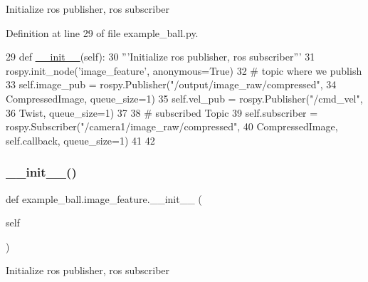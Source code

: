 \begin{DoxyVerb}Initialize ros publisher, ros subscriber\end{DoxyVerb}
 

Definition at line 29 of file example\+\_\+ball.\+py.


\begin{DoxyCode}
29     \textcolor{keyword}{def }\hyperlink{classstate__machine_1_1Play_a5993a23d8be7f7b2647f71ede0334957}{\_\_init\_\_}(self):
30         \textcolor{stringliteral}{'''Initialize ros publisher, ros subscriber'''}
31         rospy.init\_node(\textcolor{stringliteral}{'image\_feature'}, anonymous=\textcolor{keyword}{True})
32      \textcolor{comment}{# topic where we publish}
33         self.image\_pub = rospy.Publisher(\textcolor{stringliteral}{"/output/image\_raw/compressed"},
34                                          CompressedImage, queue\_size=1)
35         self.vel\_pub = rospy.Publisher(\textcolor{stringliteral}{"/cmd\_vel"},
36                                        Twist, queue\_size=1)
37 
38         \textcolor{comment}{# subscribed Topic}
39         self.subscriber = rospy.Subscriber(\textcolor{stringliteral}{"/camera1/image\_raw/compressed"},
40                                            CompressedImage, self.callback,  queue\_size=1)
41 
42 
\end{DoxyCode}
\mbox{\label{classexample__ball_1_1image__feature_a763c2126c33347904853ec4193273b8e}} 
\subsubsection{\texorpdfstring{\+\_\+\+\_\+init\+\_\+\+\_\+()}{\_\_init\_\_()}\hspace{0.1cm}{\footnotesize\ttfamily [2/3]}}
{\footnotesize\ttfamily def example\+\_\+ball.\+image\+\_\+feature.\+\_\+\+\_\+init\+\_\+\+\_\+ (\begin{DoxyParamCaption}\item[{}]{self }\end{DoxyParamCaption})}

\begin{DoxyVerb}Initialize ros publisher, ros subscriber\end{DoxyVerb}
 

